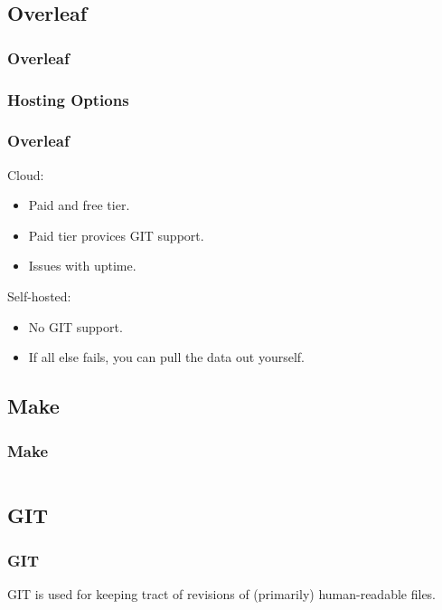 {\subsection{Overleaf}
\begin{frame}[fragile]
  \frametitle{Overleaf}
\end{frame}

\subsubsection{Hosting Options}
\begin{frame}[fragile]
  \frametitle{Overleaf }
  \vspace{3mm}
  Cloud:
  \begin{itemize}
    \item Paid and free tier.
    \item Paid tier provices GIT support.
    \item Issues with uptime.
  \end{itemize}
  
  \vspace{5mm}
  Self-hosted:
  \begin{itemize}
    \item No GIT support.
    \item If all else fails, you can pull the data out yourself.
  \end{itemize}
\end{frame}

\subsection{Make}
\begin{frame}[fragile]
  \frametitle{Make}
  \vspace{-1mm}
  \inputminted[fontsize=\tiny]{make}{Makefile}
\end{frame}

\subsection{GIT}
\begin{frame}[fragile]
  \frametitle{GIT}
  \vspace{3mm}
  GIT is used for keeping tract of revisions of (primarily) human-readable files.
  

\end{frame}}
